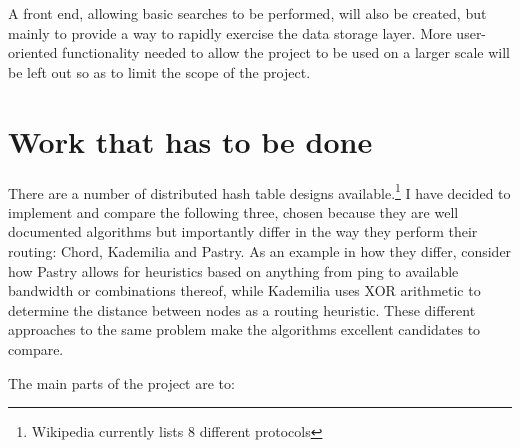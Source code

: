 A front end, allowing basic searches to be performed, will also be created, but mainly to provide a way to rapidly exercise the data storage layer. More user-oriented functionality needed to allow the project to be used on a larger scale will be left out so as to limit the scope of the project.

\section*{Work that has to be done}

There are a number of distributed hash table designs available.\footnote{ Wikipedia currently lists 8 different protocols } I have decided to implement and compare the following three, chosen because they are well documented algorithms but importantly differ in the way they perform their routing: Chord, Kademilia and Pastry. As an example in how they differ, consider how Pastry allows for heuristics based on anything from ping to available bandwidth or combinations thereof, while Kademilia uses XOR arithmetic to determine the distance between nodes as a routing heuristic. These different approaches to the same problem make the algorithms excellent candidates to compare.

The main parts of the project are to:

